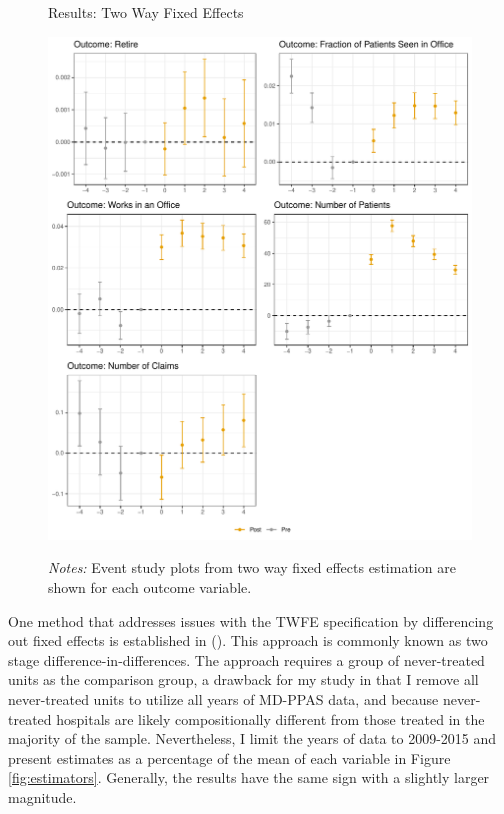 \documentclass[12pt]{article}
\begin{document}
\begin{figure}
    \centering
    \captionsetup{width=.8\linewidth}
    \caption{Results: Two Way Fixed Effects}
    \includegraphics[scale=.6]{Objects/twfe_plot.pdf}
    \label{fig:twfe}
    \vspace{2mm}
    \caption*{\footnotesize{\textit{Notes:} Event study plots from two way fixed effects estimation are shown for each outcome variable.}}
\end{figure}

One method that addresses issues with the TWFE specification by differencing out fixed effects is established in \citeauthor{gardner2021two} (\citeyear{gardner2021two}). This approach is commonly known as two stage difference-in-differences. The approach requires a group of never-treated units as the comparison group, a drawback for my study in that I remove all never-treated units to utilize all years of MD-PPAS data, and because never-treated hospitals are likely compositionally different from those treated in the majority of the sample. Nevertheless, I limit the years of data to 2009-2015 and present estimates as a percentage of the mean of each variable in Figure \ref{fig:estimators}. Generally, the results have the same sign with a slightly larger magnitude. 
\end{document}

